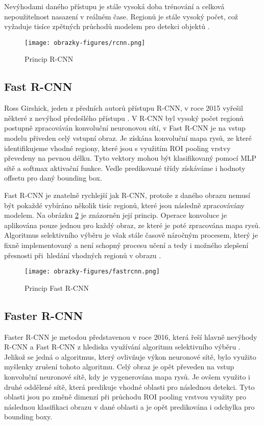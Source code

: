 Nevýhodami daného přístupu je stále vysoká doba trénování a celková nepoužitelnost nasazení v reálném čase. Regionů je stále vysoký počet, což vyžaduje tisíce zpětných průchodů modelem pro detekci objektů \cite{ObjectDetectionAlgorithms}.

\begin{figure}[!htbp]
    \centering
    \texttt{[image: obrazky-figures/rcnn.png]}
    \caption{Princip R-CNN \cite{ObjectDetectionAlgorithms}}
    \label{fig:rcnn}
\end{figure} 

\subsection{Fast R-CNN}
Ross Girshick, jeden z předních autorů přístupu R-CNN, v roce 2015 vyřešil některé z nevýhod předešlého přístupu \cite{FastRCNN}. V R-CNN byl vysoký počet regionů postupně zpracováván konvoluční neuronovou sítí, v Fast R-CNN je na vstup modelu přiveden celý vstupní obraz. Je získána konvoluční mapa rysů, ze které identifikujeme vhodné regiony, které jsou s využitím ROI pooling vrstvy převedeny na pevnou délku. Tyto vektory mohou být klasifikovaný pomocí MLP sítě a softmax aktivační funkce. Vedle predikované třídy získáváme i hodnoty offsetu pro daný bounding box.

Fast R-CNN je znatelně rychlejší jak R-CNN, protože z daného obrazu nemusí být pokaždé vybíráno několik tisíc regionů, které jsou následně zpracovávány modelem. Na obrázku \ref{fig:fastrcnn} je znázorněn její princip. Operace konvoluce je aplikována pouze jednou pro každý obraz, ze které je poté zpracována mapa rysů. Algoritmus selektivního výběru je však stále časově náročným procesem, který je fixně implementovaný a není schopný procesu učení a tedy i možného zlepšení přesnosti při~hledání vhodných regionů v obrazu \cite{ObjectDetectionAlgorithms}.

\begin{figure}[!htbp]
    \centering
    \texttt{[image: obrazky-figures/fastrcnn.png]}
    \caption{Princip Fast R-CNN \cite{ObjectDetectionAlgorithms}}
    \label{fig:fastrcnn}
\end{figure} 

\subsection{Faster R-CNN}
Faster R-CNN je metodou představenou v roce 2016, která řeší hlavně nevýhody R-CNN a Fast R-CNN z hlediska využívání algoritmu selektivního výběru \cite{FasterRCNN}. Jelikož se jedná o algoritmus, který ovlivňuje výkon neuronové sítě, bylo využito myšlenky zrušení tohoto algoritmu. Celý obraz je opět převeden na vstup konvoluční neuronové sítě, kdy je vygenerována mapa rysů. Je ovšem využito i druhé oddělené sítě, která predikuje vhodné oblasti pro následnou detekci. Tyto oblasti jsou po změně dimenzí při průchodu ROI pooling vrstvou využity pro následnou klasifikaci obrazu v dané oblasti a je opět predikována i odchylka pro bounding boxy.

